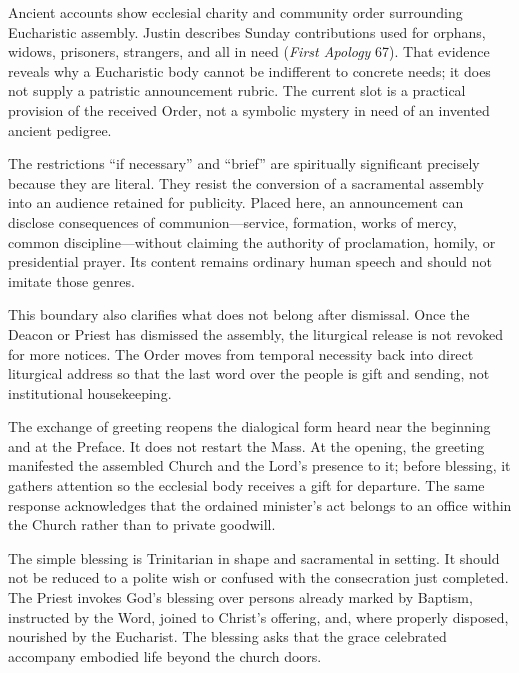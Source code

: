 Ancient accounts show ecclesial charity and community order surrounding Eucharistic assembly. Justin describes Sunday contributions used for orphans, widows, prisoners, strangers, and all in need (\emph{First Apology} 67). That evidence reveals why a Eucharistic body cannot be indifferent to concrete needs; it does not supply a patristic announcement rubric. The current slot is a practical provision of the received Order, not a symbolic mystery in need of an invented ancient pedigree.

The restrictions ``if necessary'' and ``brief'' are spiritually significant precisely because they are literal. They resist the conversion of a sacramental assembly into an audience retained for publicity. Placed here, an announcement can disclose consequences of communion---service, formation, works of mercy, common discipline---without claiming the authority of proclamation, homily, or presidential prayer. Its content remains ordinary human speech and should not imitate those genres.

This boundary also clarifies what does not belong after dismissal. Once the Deacon or Priest has dismissed the assembly, the liturgical release is not revoked for more notices. The Order moves from temporal necessity back into direct liturgical address so that the last word over the people is gift and sending, not institutional housekeeping.


The exchange of greeting reopens the dialogical form heard near the beginning and at the Preface. It does not restart the Mass. At the opening, the greeting manifested the assembled Church and the Lord's presence to it; before blessing, it gathers attention so the ecclesial body receives a gift for departure. The same response acknowledges that the ordained minister's act belongs to an office within the Church rather than to private goodwill.

The simple blessing is Trinitarian in shape and sacramental in setting. It should not be reduced to a polite wish or confused with the consecration just completed. The Priest invokes God's blessing over persons already marked by Baptism, instructed by the Word, joined to Christ's offering, and, where properly disposed, nourished by the Eucharist. The blessing asks that the grace celebrated accompany embodied life beyond the church doors.

